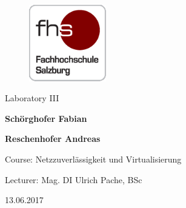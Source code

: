 
\begin{titlepage}

\hspace{7cm}

\begin{figure}[!ht]
	\centering
	\includegraphics[width=0.3\textwidth]{fhs_logo_web.png}
\end{figure}

\begin{center}
	\vspace{2cm}
	\Huge Laboratory III
	\vspace{3cm}
	
	\Large{\bf\large Schörghofer Fabian}	
	
	\Large{\bf\large Reschenhofer Andreas}
	\vspace{3cm}

	\large Course: Netzzuverlässigkeit und Virtualisierung 
	
	\large Lecturer: Mag. DI Ulrich Pache, BSc 
	
	\large 13.06.2017
\end{center}

\end{titlepage}
